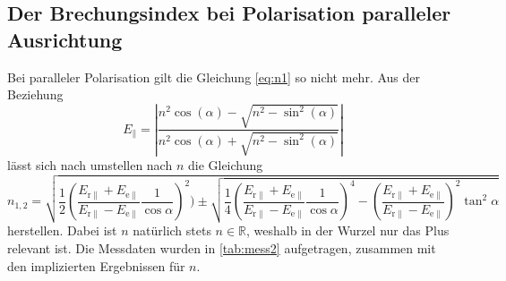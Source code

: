 \subsection{Der Brechungsindex bei Polarisation paralleler Ausrichtung}

Bei paralleler Polarisation gilt die Gleichung \ref{eq:n1} so nicht mehr.
Aus der Beziehung
\begin{equation}
  E_{\|}=\left|\frac{n^{2} \cos (\alpha)-\sqrt{n^{2}-\sin ^{2}(\alpha)}}{n^{2} \cos (\alpha)+\sqrt{n^{2}-\sin ^{2}(\alpha)}}\right|
\end{equation}
lässt sich nach umstellen nach $n$ die Gleichung
\begin{equation}
  n_{1,2} = \sqrt{\frac{1}{2} \left(\frac{E_{\mathrm{r} \|}+E_{\mathrm{e} \|}}{E_{\mathrm{r} \|}-E_{\mathrm{e} \|}} \frac{1}{\cos \alpha}\right)^{2}) \pm \sqrt{\frac{1}{4}\left(\frac{E_{\mathrm{r} \|}+E_{\mathrm{e} \|}}{E_{\mathrm{r} \|}-E_{\mathrm{e} \|}} \frac{1}{\cos \alpha}\right)^{4}-\left(\frac{E_{\mathrm{r} \|}+E_{\mathrm{e} \|}}{E_{\mathrm{r} \|}-E_{\mathrm{e} \|}}\right)^{2} \tan ^{2} \alpha}}
\end{equation}
herstellen.
Dabei ist $n$ natürlich stets $n \in \mathbb{R}$, weshalb in der Wurzel nur das Plus relevant ist.
Die Messdaten wurden in \autoref{tab:mess2} aufgetragen, zusammen mit den implizierten Ergebnissen für $n$.


